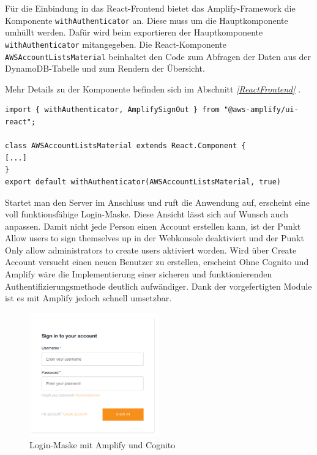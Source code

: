Für die Einbindung in das React-Frontend bietet das Amplify-Framework die Komponente \verb+withAuthenticator+ an.
Diese muss um die Hauptkomponente umhüllt werden.
Dafür wird beim exportieren der Hauptkomponente \verb+withAuthenticator+ mitangegeben. \cite[]{ImpAuth}
Die React-Komponente \verb+AWSAccountListsMaterial+ beinhaltet den Code zum Abfragen der Daten aus der DynamoDB-Tabelle und zum Rendern der Übersicht.

Mehr Details zu der Komponente befinden sich im Abschnitt \textit{\ref{ReactFrontend} }.
\clearpage
\begin{lstlisting}[basicstyle=\ttfamily\small, breaklines=true , frame = single, backgroundcolor=\color{flashwhite},caption={Auszug aus React-Frontend} ]
import { withAuthenticator, AmplifySignOut } from "@aws-amplify/ui-react";

class AWSAccountListsMaterial extends React.Component {
[...]
}
export default withAuthenticator(AWSAccountListsMaterial, true)
    \end{lstlisting}



Startet man den Server im Anschluss und ruft die Anwendung auf, erscheint eine voll funktionsfähige Login-Maske.
Diese Ansicht lässt sich auf Wunsch auch anpassen.
Damit nicht jede Person einen Account erstellen kann, ist der Punkt \glqq Allow users to sign themselves up\grqq{} in der Webkonsole deaktiviert und der Punkt \glqq Only allow administrators to create users\grqq{} aktiviert worden.
Wird über \glqq Create Account\grqq{} versucht einen neuen Benutzer zu erstellen, erscheint
Ohne Cognito und Amplify wäre die Implementierung einer sicheren und funktionierenden Authentifizierungsmethode deutlich aufwändiger.
Dank der vorgefertigten Module ist es mit Amplify jedoch schnell umsetzbar.

\begin{figure}[htbp]
    \centering
    \includegraphics[width=0.5\textwidth]{50-Implementierung/Login.png}
    \caption{Login-Maske mit Amplify und Cognito}
    \label{fig:meine-grafik}
\end{figure}


